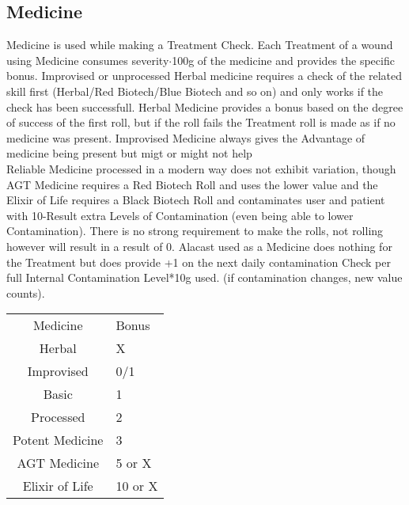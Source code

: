 \subsection{Medicine}
Medicine is used while making a Treatment Check.
Each Treatment of a wound using Medicine consumes
severity\(\cdot\)100g of the medicine and provides the specific bonus.
Improvised or unprocessed Herbal medicine
requires a check of the related skill first (Herbal/Red Biotech/Blue Biotech and so on) and only works if the check
has been successfull.
Herbal Medicine provides a bonus based on the degree of success of the first roll, but if the
roll fails the Treatment roll is made as if no medicine was present.
Improvised Medicine always gives the Advantage
of medicine being present but migt or might not help\\
Reliable Medicine processed in a modern way does not exhibit variation, though AGT Medicine requires a Red Biotech
Roll and uses the lower value and the Elixir of Life requires a Black Biotech Roll and contaminates user and patient
with 10-Result extra Levels of Contamination (even being able to lower Contamination).
There is no strong
requirement to make the rolls, not rolling however will result in a result of 0.
Alacast used as a Medicine does nothing for the Treatment but does provide +1 on the next daily contamination Check
per full Internal Contamination Level*10g used. (if contamination changes, new value counts).
\begin{tabular}{cl}
    Medicine & Bonus\\
    Herbal & X\\
    Improvised & 0/1\\
    Basic & 1\\
    Processed & 2\\
    Potent Medicine & 3\\
    AGT Medicine & 5 or X\\
    Elixir of Life & 10 or X\\
\end{tabular}\vspace{1.5cm}
